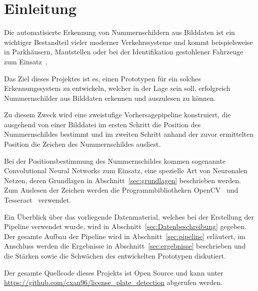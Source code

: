 \section{Einleitung}

Die automatisierte Erkennung von Nummernschildern aus Bilddaten
ist ein wichtiger Bestandteil vieler moderner Verkehrssysteme
und kommt beispielsweise in Parkh\"ausern, Mautstellen
oder bei der Identifikation gestohlener Fahrzeuge zum
Einsatz~\cite{silva2018a}.

Das Ziel dieses Projektes ist es, einen Prototypen f\"ur ein solches
Erkennungssystem zu entwickeln, welcher in der
Lage sein soll, erfolgreich Nummernschilder aus Bilddaten erkennen
und auszulesen zu k\"onnen.

Zu diesem Zweck wird eine zweistufige Vorhersagepipeline konstruiert,
die ausgehend von einer Bilddatei im ersten Schritt die Position des
Nummernschildes bestimmt und im zweiten Schritt anhand der zuvor ermittelten
Position die Zeichen des Nummernschildes ausliest.

Bei der Positionsbestimmung des Nummernschildes kommen sogenannte
Convolutional Neural Networks zum Einsatz, eine spezielle Art von
Neuronalen Netzen, deren Grundlagen in Abschnitt~\ref{sec:grundlagen}
beschrieben werden. Zum Auslesen der Zeichen werden die
Programmbibliotheken OpenCV~\cite{opencv_library} und Tesseract~\cite{smith_2007}
verwendet.

Ein \"Uberblick \"uber das vorliegende Datenmaterial, welches
bei der Erstellung der Pipeline verwendet wurde, wird in
Abschnitt~\ref{sec:Datenbeschreibung} gegeben.
Der gesamte Aufbau der Pipeline wird in Abschnitt~\ref{sec:pipeline}
erl\"autert, im Anschluss werden die Ergebnisse in Abschnitt~\ref{sec:ergebnisse}
beschrieben und die St\"arken sowie die Schw\"achen des entwickelten
Prototypen diskutiert.

Der gesamte Quellcode dieses Projekts ist Open Source und kann
unter \url{https://github.com/cxan96/license_plate_detection}
abgerufen werden.
